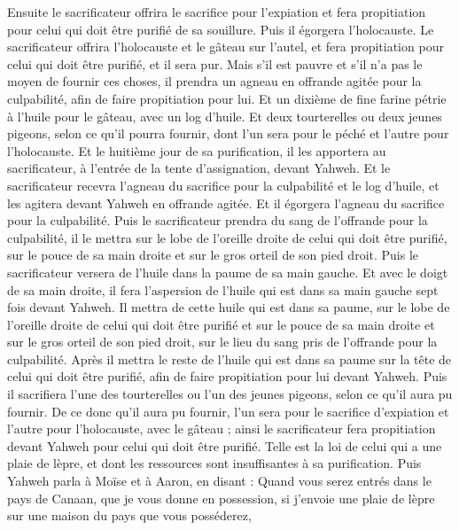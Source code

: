 \begin{multicols}{2}
Ensuite le sacrificateur offrira le sacrifice pour l'expiation et fera propitiation pour celui qui doit être purifié de sa souillure. Puis il égorgera l'holocauste.
Le sacrificateur offrira l'holocauste et le gâteau sur l'autel, et fera propitiation pour celui qui doit être purifié, et il sera pur.
Mais s'il est pauvre et s'il n'a pas le moyen de fournir ces choses, il prendra un agneau en offrande agitée pour la culpabilité, afin de faire propitiation pour lui. Et un dixième de fine farine pétrie à l'huile pour le gâteau, avec un log d'huile.
Et deux tourterelles ou deux jeunes pigeons, selon ce qu'il pourra fournir, dont l'un sera pour le péché et l'autre pour l'holocauste.
Et le huitième jour de sa purification, il les apportera au sacrificateur, à l'entrée de la tente d'assignation, devant Yahweh.
Et le sacrificateur recevra l'agneau du sacrifice pour la culpabilité et le log d'huile, et les agitera devant Yahweh en offrande agitée.
Et il égorgera l'agneau du sacrifice pour la culpabilité. Puis le sacrificateur prendra du sang de l'offrande pour la culpabilité, il le mettra sur le lobe de l'oreille droite de celui qui doit être purifié, sur le pouce de sa main droite et sur le gros orteil de son pied droit.
Puis le sacrificateur versera de l'huile dans la paume de sa main gauche.
Et avec le doigt de sa main droite, il fera l'aspersion de l'huile qui est dans sa main gauche sept fois devant Yahweh.
Il mettra de cette huile qui est dans sa paume, sur le lobe de l'oreille droite de celui qui doit être purifié et sur le pouce de sa main droite et sur le gros orteil de son pied droit, sur le lieu du sang pris de l'offrande pour la culpabilité.
Après il mettra le reste de l'huile qui est dans sa paume sur la tête de celui qui doit être purifié, afin de faire propitiation pour lui devant Yahweh.
Puis il sacrifiera l'une des tourterelles ou l'un des jeunes pigeons, selon ce qu'il aura pu fournir.
De ce donc qu'il aura pu fournir, l'un sera pour le sacrifice d'expiation et l'autre pour l'holocauste, avec le gâteau ; ainsi le sacrificateur fera propitiation devant Yahweh pour celui qui doit être purifié.
Telle est la loi de celui qui a une plaie de lèpre, et dont les ressources sont insuffisantes à sa purification.
Puis Yahweh parla à Moïse et à Aaron, en disant :
Quand vous serez entrés dans le pays de Canaan, que je vous donne en possession, si j'envoie une plaie de lèpre sur une maison du pays que vous posséderez,

\end{multicols}
